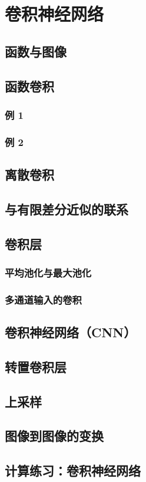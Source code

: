 \chapter{卷积神经网络}

\section{函数与图像}

\section{函数卷积}
\subsection{例 1}
\subsection{例 2}

\section{离散卷积}

\section{与有限差分近似的联系}

\section{卷积层}
\subsection{平均池化与最大池化}
\subsection{多通道输入的卷积}

\section{卷积神经网络（CNN）}

\section{转置卷积层}

\section{上采样}

\section{图像到图像的变换}

\section{计算练习：卷积神经网络}

\newpage

